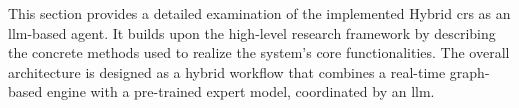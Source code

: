 This section provides a detailed examination of the implemented Hybrid \acl{crs} as an \ac{llm}-based agent. It builds upon the high-level research framework by describing the concrete methods used to realize the system's core functionalities. The overall architecture is designed as a hybrid workflow that combines a real-time graph-based engine with a pre-trained expert model, coordinated by an \ac{llm}.